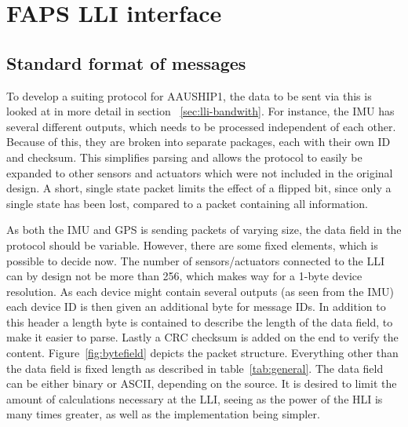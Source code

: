 \chapter{FAPS LLI interface}
\label{chap:Protocol}
\section{Standard format of messages}

To develop a suiting protocol for AAUSHIP1, the data to be sent via this is looked at in more detail in section ~\vref{sec:lli-bandwith}. For instance, the \ac{IMU} has several different outputs, which needs to be processed independent of each other. Because of this, they are broken into separate packages, each with their own ID and checksum. This simplifies parsing and allows the protocol to easily be expanded to other sensors and actuators which were not included in the original design. A short, single state packet limits the effect of a flipped bit, since only a single state has been lost, compared to a packet containing all information.

As both the \ac{IMU} and \ac{GPS} is sending packets of varying size, the data field in the protocol should be variable. However, there are some fixed elements, which is possible to decide now. The number of sensors/actuators connected to the \ac{LLI} can by design not be more than 256, which makes way for a 1-byte device resolution. As each device might contain several outputs (as seen from the \ac{IMU}) each device ID is then given an additional byte for message IDs. In addition to this header a length byte is contained to describe the length of the data field, to make it easier to parse. Lastly a \ac{CRC} checksum is added on the end to verify the content. Figure~\vref{fig:bytefield} depicts the packet structure. Everything other than the data field is fixed length as described in table~\vref{tab:general}. 
The data field can be either binary or ASCII, depending on the source. It is desired to limit the amount of calculations necessary at the LLI, seeing as the power of the HLI is many times greater, as well as the implementation being simpler.

